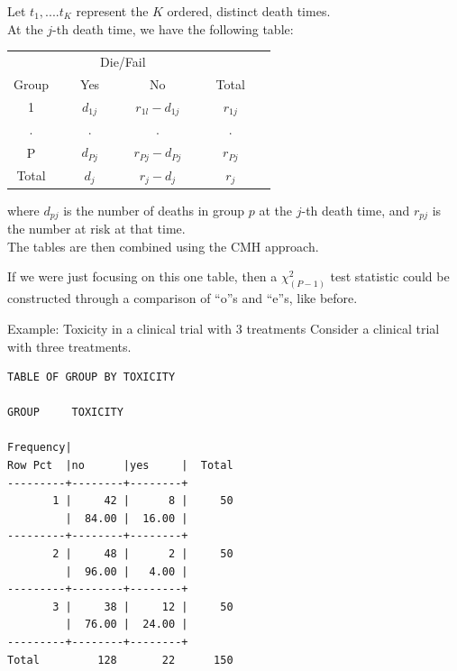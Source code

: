 \documentclass[envcountsect, 10pt, portrait, palatino]{beamer}
\begin{document}
\begin{frame}
Let $t_1,....t_K$ represent the $K$ ordered, distinct death
times.\\[2ex]
At the $j$-th death time, we have the following table:

\begin{center}
\begin{tabular}{cccc}
\hline \hline
& \multicolumn{2}{c}{Die/Fail} & \\ \cline{2-3}
\multicolumn{1}{c}{Group } & ~~~Yes~~~ & ~~~No~~~ & ~~~Total~~~\\ \hline
1 &  $d_{1j}$  & $r_{1l} - d_{1j}$ & $r_{1j}$ \\[2ex]
. &    .       &     .             &       .    \\[2ex]
P & $d_{Pj}$   & $r_{Pj} - d_{Pj}$ & $r_{Pj}$  \\ \hline
Total &  $d_j  $ & $r_j - d_j  $ & $r_j  $  \\ \hline \hline
\end{tabular}
\end{center}

where $d_{pj}$ is  the number of deaths in group $p$ at the $j$-th death time, and
$r_{pj}$ is the number at risk at that time.
\\[2ex]
The tables are then combined using the CMH approach.

If we were just focusing on this one table, then a $\chi^2_{(P-1)}$
test statistic could be constructed through a comparison of ``o''s and
``e''s, like before.
\end{frame}

\begin{frame}[fragile]{Example: Toxicity in a clinical trial with 3 treatments}
Consider a clinical trial with three treatments.

\scriptsize
\begin{verbatim}
TABLE OF GROUP BY TOXICITY

GROUP     TOXICITY

Frequency|
Row Pct  |no      |yes     |  Total
---------+--------+--------+
       1 |     42 |      8 |     50
         |  84.00 |  16.00 |
---------+--------+--------+
       2 |     48 |      2 |     50
         |  96.00 |   4.00 |
---------+--------+--------+
       3 |     38 |     12 |     50
         |  76.00 |  24.00 |
---------+--------+--------+
Total         128       22      150
\end{verbatim}
\end{frame}
\end{document}
